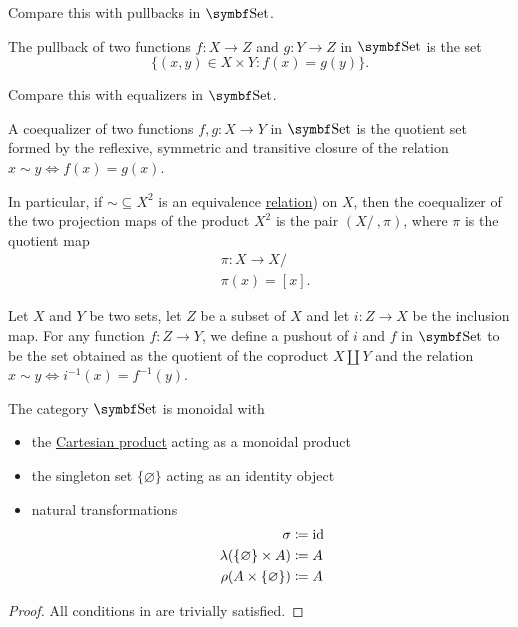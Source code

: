 \begin{proposition}
\begin{defenum}
    Compare this with pullbacks in \( \Cat{Set} \).

     The pullback of two functions \( f: X \to Z \) and \( g: Y \to Z \) in \( \Cat{Set} \) is the set
    \begin{equation*}
      \{ (x, y) \in X \times Y \colon f(x) = g(y) \}.
    \end{equation*}

    Compare this with equalizers in \( \Cat{Set} \).

     A coequalizer of two functions \( f, g: X \to Y \) in \( \Cat{Set} \) is the quotient set formed by the reflexive, symmetric and transitive closure of the relation \( x \sim y \iff f(x) = g(x) \).

    In particular, if \( \sim \subseteq X^2 \) is an equivalence \hyperref[def:equivalence_relation]{relation}) on \( X \), then the coequalizer of the two projection maps of the product \( X^2 \) is the pair \( (X / ~, \pi) \), where \( \pi \) is the quotient map
    \begin{align*}
      &\pi: X \to X / ~ \\
      &\pi(x) = [x].
    \end{align*}

     Let \( X \) and \( Y \) be two sets, let \( Z \) be a subset of \( X \) and let \( i: Z \to X \) be the inclusion map. For any function \( f: Z \to Y \), we define a pushout of \( i \) and \( f \) in \( \Cat{Set} \) to be the set obtained as the quotient of the coproduct \( X \coprod Y \) and the relation \( x \sim y \iff i^{-1}(x) = f^{-1}(y) \).
  \end{defenum}
\end{proposition}

\begin{proposition}\label{thm:set_is_monoidal}
  The category \( \Cat{Set} \) is monoidal with
  \begin{itemize}
    \item the \hyperref[def:cartesian_product]{Cartesian product} acting as a monoidal product
    \item the singleton set \( \{ \varnothing \} \) acting as an identity object
    \item natural transformations
    \begin{align*}
      \sigma &\coloneqq \operatorname{id} \\
      \lambda(\{ \varnothing \} \times A) &\coloneqq A \\
      \rho(A \times \{ \varnothing \}) &\coloneqq A
    \end{align*}
  \end{itemize}
\end{proposition}
\begin{proof}
  All conditions in  are trivially satisfied.
\end{proof}
